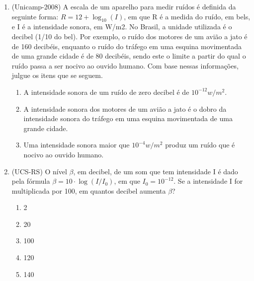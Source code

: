 \begin{enumerate}
\item {} \label{Unicamp2008}

(Unicamp-2008) A escala de um aparelho para medir ruídos é definida da seguinte forma: $R = 12 + \log_{10}(I)$, em que R 
é a medida do ruído, em bels, e I é a intensidade sonora, em W/m2. No Brasil, a unidade utilizada é o decibel (1/10 do 
bel). Por exemplo, o ruído dos motores de um avião a jato é de 160 decibéis, enquanto o ruído do tráfego em uma esquina 
movimentada de uma grande cidade é de 80 decibéis, sendo este o limite a partir do qual o ruído passa a ser nocivo ao 
ouvido humano. Com base nessas informações, julgue os itens que se seguem.

\begin{enumerate}
\item A intensidade sonora de um ruído de zero decibel é de $10^{-12} w/m^2$. 

\item A intensidade sonora dos motores de um avião a jato é o dobro da intensidade sonora do tráfego em uma esquina movimentada de uma grande cidade.

\item Uma intensidade sonora maior que $10^{-4} w/m^2$ produz um ruído que é nocivo ao ouvido humano. 
\end{enumerate}


\item {}\label{UCSSRS}

(UCS-RS) O nível $\beta$, em decibel, de um som que tem intensidade I é dado pela fórmula $\beta = 10 \cdot \log
(I/I_0)$, em que $I_0 = 10^{-12}$. Se a intensidade I for multiplicada por 100, em quantos decibel aumenta $\beta$?

\begin{enumerate}
    \item 2
    \item 20
    \item 100
    \item 120
    \item 140
\end{enumerate}
\end{enumerate}
\clearpage

